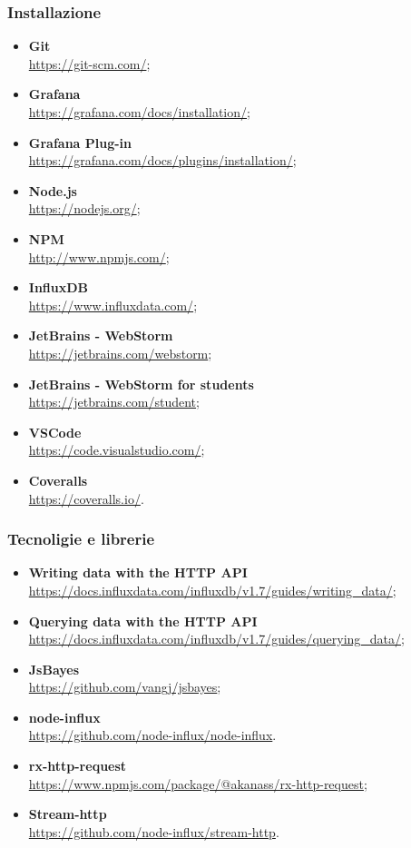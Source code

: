 \subsubsection{Installazione}
\begin{itemize}
	\item{\textbf{Git}\\
		\url{https://git-scm.com/}};
	\item{\textbf{Grafana}\\
		\url{https://grafana.com/docs/installation/}};
	\item{\textbf{Grafana Plug-in}\\
		\url{https://grafana.com/docs/plugins/installation/}};
	\item{\textbf{Node.js}\\
		\url{https://nodejs.org/}};
	\item{\textbf{NPM}\\
		\url{http://www.npmjs.com/}};
	\item{\textbf{InfluxDB}\\
		\url{https://www.influxdata.com/}};
	\item{\textbf{JetBrains - WebStorm}\\
		\url{https://jetbrains.com/webstorm}};
	\item{\textbf{JetBrains - WebStorm for students}\\
		\url{https://jetbrains.com/student}};
	\item{\textbf{VSCode}\\
		\url{https://code.visualstudio.com/}};
	\item{\textbf{Coveralls}\\
		\url{https://coveralls.io/}}.
\end{itemize}

\subsubsection{Tecnoligie e librerie}
\begin{itemize}
	\item{\textbf{Writing data with the HTTP API}\\
		\url{https://docs.influxdata.com/influxdb/v1.7/guides/writing_data/}};
	\item{\textbf{Querying data with the HTTP API}\\
		\url{https://docs.influxdata.com/influxdb/v1.7/guides/querying_data/}};
	\item{\textbf{JsBayes}\\
		\url{https://github.com/vangj/jsbayes}};
	\item{\textbf{node-influx}\\
		\url{https://github.com/node-influx/node-influx}}.
	\item{\textbf{rx-http-request}\\
		\url{https://www.npmjs.com/package/@akanass/rx-http-request}};
	\item{\textbf{Stream-http}\\
		\url{https://github.com/node-influx/stream-http}}.
\end{itemize}


